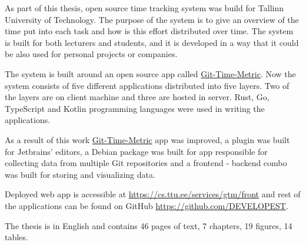 As part of this thesis, open source time tracking system was build for Tallinn University of Technology.
The purpose of the system is to give an overview of the time put into each task and how is
this effort distributed over time.
The system is built for both lecturers and students, and it is developed in a way that it
could be also used for personal projects or companies.

The system is built around an open source app called \href{https://github.com/git-time-metric/gtm}{Git-Time-Metric}.
Now the system consists of five different applications distributed into five layers.
Two of the layers are on client machine and three are hosted in server.
Rust, Go, TypeScript and Kotlin programming languages were used in writing the applications.

As a result of this work \href{https://github.com/git-time-metric/gtm}{Git-Time-Metric} app was improved,
a plugin was built for Jetbrains' editors,
a Debian package was built for app responsible for collecting data from multiple Git repositories
and a frontend - backend combo was built for storing and visualizing data.

Deployed web app is accessible at \href{https://cs.ttu.ee/services/gtm/front}{https://cs.ttu.ee/services/gtm/front}
and rest of the applications can be found on GitHub \href{https://github.com/DEVELOPEST}{https://github.com/DEVELOPEST}.

The thesis is in English and contains 46 pages of text, 7 chapters, 19 figures, 14 tables.